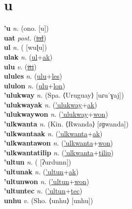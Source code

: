 \section{u}

\textbf{'u} \textit{n.} (ono. [u])
 \label{'u} \\
\textbf{uat} \textit{post.} (\hyperref[ial]{\sout{ial}})
 \label{uat} \\
\textbf{ul} \textit{n.} ( [wuɭu])
 \label{ul} \\
\textbf{ulak} \textit{n.} (\hyperref[ul]{ul}+\hyperref[ak]{ak})
 \label{ulak} \\
\textbf{ulu} \textit{v.} (\hyperref[iti]{\sout{iti}})
 \label{ulu} \\
\textbf{ulules} \textit{n.} (\hyperref[ulu]{ulu}+\hyperref[les]{les})
 \label{ulules} \\
\textbf{ululon} \textit{n.} (\hyperref[ulu]{ulu}+\hyperref[lon]{lon})
 \label{ululon} \\
\textbf{'ulukway} \textit{n.} (Spa. ⟨Uruguay⟩ [uɾuˈɣaj])
 \label{'ulukway} \\
\textbf{'ulukwayak} \textit{n.} (\hyperref['ulukway]{'ulukway}+\hyperref[ak]{ak})
 \label{'ulukwayak} \\
\textbf{'ulukwaywon} \textit{n.} (\hyperref['ulukway]{'ulukway}+\hyperref[won]{won})
 \label{'ulukwaywon} \\
\textbf{'ulkwanta} \textit{n.} (Kin. ⟨Rwanda⟩ [ɾɡwanda])
 \label{'ulkwanta} \\
\textbf{'ulkwantaak} \textit{n.} (\hyperref['ulkwanta]{'ulkwanta}+\hyperref[ak]{ak})
 \label{'ulkwantaak} \\
\textbf{'ulkwantawon} \textit{n.} (\hyperref['ulkwanta]{'ulkwanta}+\hyperref[won]{won})
 \label{'ulkwantawon} \\
\textbf{'ulkwantatilip} \textit{n.} (\hyperref['ulkwanta]{'ulkwanta}+\hyperref[tilip]{tilip})
 \label{'ulkwantatilip} \\
\textbf{'ultun} \textit{n.} ( [ʔurdunn])
 \label{'ultun} \\
\textbf{'ultunak} \textit{n.} (\hyperref['ultun]{'ultun}+\hyperref[ak]{ak})
 \label{'ultunak} \\
\textbf{'ultunwon} \textit{n.} (\hyperref['ultun]{'ultun}+\hyperref[won]{won})
 \label{'ultunwon} \\
\textbf{'ultuntec} \textit{n.} (\hyperref['ultun]{'ultun}+\hyperref[tec]{tec})
 \label{'ultuntec} \\
\textbf{unhu} \textit{v.} (Sho. ⟨unhu⟩ [unhu])
 \label{unhu} \\
